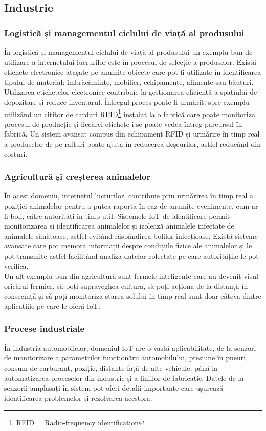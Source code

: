 \documentclass[12pt,a4paper]{report}
\begin{document}
\subsection{Industrie}

\subsubsection{Logistică și managementul ciclului de viață al produsului}
În logistică și managementul ciclului de viață al produsului un exemplu bun de utilizare a internetului lucrurilor este în procesul de selecție a produselor. Există etichete electronice atașate pe anumite obiecte care pot fi utilizate în identificarea tipului de material: îmbrăcăminte, mobilier, echipamente, alimente sau băuturi. Utilizarea etichetelor electronice contribuie la gestionarea eficientă a spațiului de depozitare și reduce inventarul. Întregul proces poate fi urmărit, spre exemplu utilizând un cititor de carduri RFID\footnote{RFID = Radio-frequency identification} instalat la o fabrică care poate monitoriza procesul de producție și fiecărei etichete i se poate vedea întreg parcursul în fabrică. Un sistem avansat compus din echipament RFID și urmărire în timp real a produselor de pe rafturi poate ajuta în reducerea deșeurilor, astfel reducând din costuri.

\subsubsection{Agricultură și creșterea animalelor}
În acest domeniu, internetul lucrurilor, contribuie prin urmărirea în timp real a poziției animalelor pentru a putea raporta în caz de anumite evenimente, cum ar fi boli, către autorități în timp util. Sistemele IoT de identificare permit monitorizarea și identificarea animalelor și izolează animalele infectate de animalele sănătoase, astfel evitând răspândirea bolilor infecțioase. Există sisteme avansate care pot memora informații despre condițiile fizice ale animalelor și le pot transmite astfel facilitând analiza datelor colectate pe care autoritățile le pot verifica.\\
Un alt exemplu bun din agricultură sunt fermele inteligente care au devenit visul oricărui fermier, să poți supraveghea cultura, să poți acționa de la distanță în consecință și să poți monitoriza starea solului în timp real sunt doar câteva dintre aplicațiile pe care le oferă IoT.

\subsubsection{Procese industriale}
În industria automobilelor, domeniul IoT are o vastă aplicabilitate, de la senzori de monitorizare a parametrilor funcționării automobilului, presiune în pneuri, consum de carburant, poziție, distanțe față de alte vehicule, până la automatizarea proceselor din industrie și a liniilor de fabricație. Datele de la senzorii amplasați în sistem pot oferi detalii importante care ușurează identificarea problemelor și rezolvarea acestora. 
\end{document}
